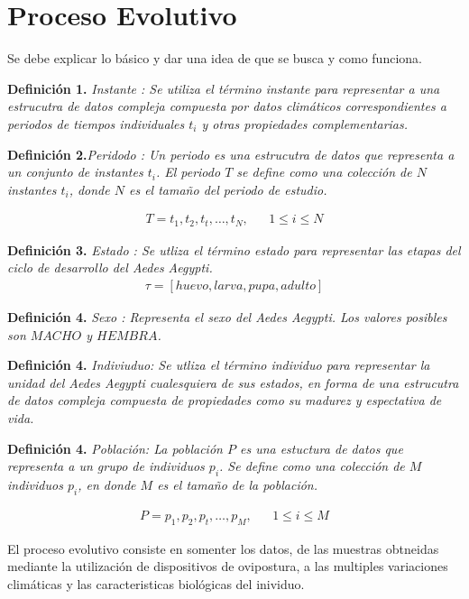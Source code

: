 \section{Proceso Evolutivo}

Se debe explicar lo básico y dar una idea de que se busca y como funciona.


\textbf{Definición 1.} \em Instante \em : Se utiliza el término instante
    para representar a una estrucutra de datos compleja compuesta por
    datos climáticos correspondientes a periodos de tiempos individuales
    $t_{i}$ y otras propiedades complementarias.


\textbf{Definición 2.}\em Peridodo \em : Un periodo es una estrucutra de
    datos que representa a un conjunto de instantes $t_{i}$. El periodo
    $T$  se define como una colección de $N$ instantes
    $t_{i}$, donde $N$ es el tamaño del periodo de estudio.

    \begin{align*}
        T = t_1,t_2,t_t,\ldots,t_N , & & 1 \leq i \leq N
    \end{align*}


\textbf{Definición 3.} \em Estado \em : Se utliza el término estado
    para representar las etapas del ciclo de desarrollo del \em Aedes Aegypti\em.
    \begin{align*}
        \tau = [huevo, larva, pupa, adulto]
    \end{align*}

\textbf{Definición 4.} \em Sexo \em : Representa el sexo del \em Aedes
    Aegypti\em. Los valores posibles son $MACHO$ y $HEMBRA$.

\textbf{Definición 4.} \em Indiviuduo\em : Se utliza el término individuo
    para representar la unidad del \em Aedes Aegypti \em cualesquiera de sus
    estados, en forma de una estrucutra de datos compleja compuesta de
    propiedades como su madurez y espectativa de vida.

\textbf{Definición 4.} \em Población\em : La población $P$ es una estuctura
    de datos que representa a un grupo de individuos $p_{i}$. Se define como
    una colección de $M$ individuos $p_{i}$, en donde $M$ es el tamaño de
    la población.

    \begin{align*}
        P = p_1,p_2,p_t,\ldots,p_M,  & & 1 \leq i \leq M
    \end{align*}


El proceso evolutivo consiste en somenter los datos, de las muestras obtneidas
mediante la utilización de dispositivos de ovipostura, a las multiples
variaciones climáticas y las caracteristicas biológicas del inividuo.

